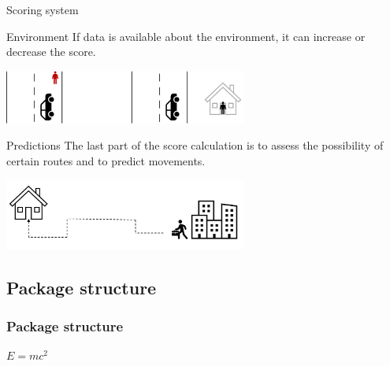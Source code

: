 \documentclass{beamer}
\begin{document}
\begin{frame}{Scoring system}
        \begin{block}{Environment}
            If data is available about the environment, it can increase or decrease the score.
        \end{block}
        \vspace{0.1cm}
        \centering
        \includegraphics[width=0.6\textwidth]{pics/environment}
        \vspace{0.5cm}
        \begin{block}{Predictions}
            The last part of the score calculation is to assess the possibility of certain routes and to predict movements.
        \end{block}
        \centering
        \includegraphics[width=0.6\textwidth]{pics/route_prediction}

\end{frame}

\subsection{Package structure}

\begin{frame}
    \frametitle{Package structure}
    \begin{theorem}
        $E = mc^2$
    \end{theorem}
\end{frame}


\end{document}
